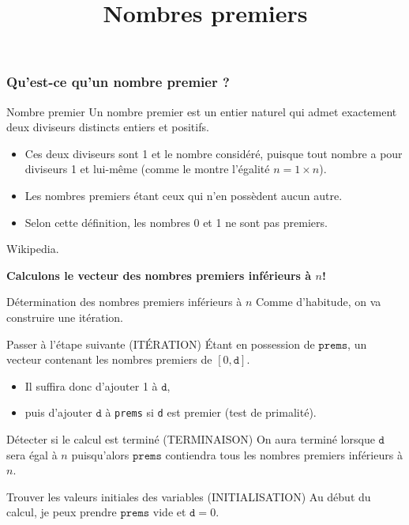 \documentclass[10pt]{beamer}
\title{Nombres premiers}
\begin{document}
\maketitle



\begin{frame}[fragile]
  \frametitle{Qu'est-ce qu'un nombre premier ?}
  \begin{alertblock}{Nombre premier}
    \alert{Un nombre premier est un entier naturel qui admet exactement deux diviseurs distincts entiers et positifs.}\\
    \begin{itemize}
    \item Ces deux diviseurs sont 1 et le nombre considéré, puisque tout nombre a pour diviseurs 1 et lui-même (comme le montre l’égalité $ n=1\times n$). 
    \item Les nombres premiers étant ceux qui n’en possèdent aucun autre.
    \item Selon cette définition, les nombres 0 et 1 ne sont pas premiers.
    \end{itemize}
    \begin{flushright}
      Wikipedia.
    \end{flushright}
  \end{alertblock}

  \begin{center}
    \textbf{\alert{Calculons le vecteur des nombres premiers inférieurs à $n$!}}
  \end{center}


\end{frame}



\begin{frame}{Détermination des nombres premiers inférieurs à $n$}
  Comme d'habitude, on va construire une itération.
  \begin{block}{Passer à l'étape suivante (\alert{ITÉRATION})}
    Étant en possession de $\mathtt{prems}$, un vecteur contenant les nombres premiers de $[0, \mathtt{d}]$.
    \begin{itemize}
    \item Il suffira donc d'ajouter 1 à $\mathtt{d}$, 
    \item puis d'ajouter $\mathtt{d}$ à \texttt{prems} si \texttt{d} est premier (\alert{test de primalité}).
    \end{itemize}

  \end{block}
  \begin{block}{Détecter si le calcul est terminé (\alert{TERMINAISON})}
    On aura terminé lorsque $\mathtt{d}$ sera égal à $n$ puisqu'alors $\mathtt{prems}$ contiendra tous les nombres premiers inférieurs à $n$.
  \end{block}

  \begin{block}{Trouver les valeurs initiales des variables (\alert{INITIALISATION})}
    Au début du calcul, je peux prendre $\mathtt{prems}$ vide et $\mathtt{d} =0$. \\
  \end{block}
\end{frame}
\end{document}
